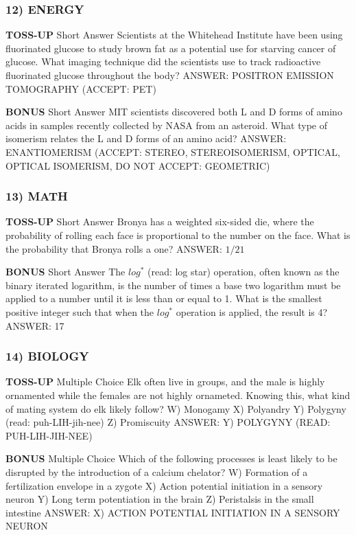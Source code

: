 \documentclass{article}
\begin{document}
\subsubsection*{12) ENERGY}
\textbf{TOSS-UP}
Short Answer Scientists at the Whitehead Institute have been using fluorinated glucose to study brown fat as a potential use for starving cancer of glucose. What imaging technique did the scientists use to track radioactive fluorinated glucose throughout the body?
ANSWER: POSITRON EMISSION TOMOGRAPHY (ACCEPT: PET)

\textbf{BONUS}
Short Answer MIT scientists discovered both L and D forms of amino acids in samples recently collected by NASA from an asteroid. What type of isomerism relates the L and D forms of an amino acid?
ANSWER: ENANTIOMERISM (ACCEPT: STEREO, STEREOISOMERISM, OPTICAL, OPTICAL ISOMERISM, DO NOT ACCEPT: GEOMETRIC)

\subsubsection*{13) MATH}
\textbf{TOSS-UP}
Short Answer Bronya has a weighted six-sided die, where the probability of rolling each face is proportional to the number on the face. What is the probability that Bronya rolls a one?
ANSWER: $1/21$

\textbf{BONUS}
Short Answer The $log^{*}$ (read: log star) operation, often known as the binary iterated logarithm, is the number of times a base two logarithm must be applied to a number until it is less than or equal to 1. What is the smallest positive integer such that when the $log^{*}$ operation is applied, the result is 4?
ANSWER: 17

\subsubsection*{14) BIOLOGY}
\textbf{TOSS-UP}
Multiple Choice Elk often live in groups, and the male is highly ornamented while the females are not highly ornameted. Knowing this, what kind of mating system do elk likely follow?
W) Monogamy
X) Polyandry
Y) Polygyny (read: puh-LIH-jih-nee)
Z) Promiscuity
ANSWER: Y) POLYGYNY (READ: PUH-LIH-JIH-NEE)

\textbf{BONUS}
Multiple Choice Which of the following processes is least likely to be disrupted by the introduction of a calcium chelator?
W) Formation of a fertilization envelope in a zygote
X) Action potential initiation in a sensory neuron
Y) Long term potentiation in the brain
Z) Peristalsis in the small intestine
ANSWER: X) ACTION POTENTIAL INITIATION IN A SENSORY NEURON
\end{document}
